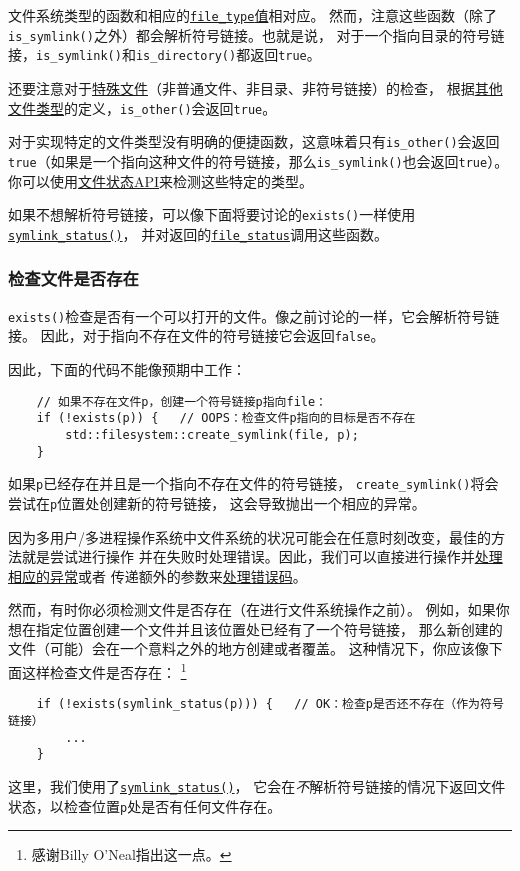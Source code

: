 文件系统类型的函数和相应的\hyperref[ch20.2.7]{\texttt{file\_type}值}相对应。
然而，注意这些函数（除了\texttt{is\_symlink()}之外）都会解析符号链接。也就是说，
对于一个指向目录的符号链接，\texttt{is\_symlink()}和\texttt{is\_directory()}都返回\texttt{true}。

还要注意对于\hyperref[文件类型]{特殊文件}（非普通文件、非目录、非符号链接）的检查，
根据\hyperref[文件类型]{其他文件类型}的定义，\texttt{is\_other()}会返回\texttt{true}。

对于实现特定的文件类型没有明确的便捷函数，这意味着只有\texttt{is\_other()}会返回
\texttt{true}（如果是一个指向这种文件的符号链接，那么\texttt{is\_symlink()}也会返回\texttt{true}）。
你可以使用\hyperref[ch20.4.2]{文件状态API}来检测这些特定的类型。

如果不想解析符号链接，可以像下面将要讨论的\texttt{exists()}一样使用\hyperref[t20.12]{\texttt{symlink\_status()}}，
并对返回的\hyperref[ch20.4.2]{\texttt{file\_status}}调用这些函数。

\subsubsection{检查文件是否存在}\label{ch20.4.1.1}
\texttt{exists()}检查是否有一个可以打开的文件。像之前讨论的一样，它会解析符号链接。
因此，对于指向不存在文件的符号链接它会返回\texttt{false}。

因此，下面的代码不能像预期中工作：
\begin{lstlisting}
    // 如果不存在文件p，创建一个符号链接p指向file：
    if (!exists(p)) {   // OOPS：检查文件p指向的目标是否不存在
        std::filesystem::create_symlink(file, p);
    }
\end{lstlisting}
如果\texttt{p}已经存在并且是一个指向不存在文件的符号链接，
\texttt{create\_symlink()}将会尝试在\texttt{p}位置处创建新的符号链接，
这会导致抛出一个相应的异常。

因为多用户/多进程操作系统中文件系统的状况可能会在任意时刻改变，最佳的方法就是尝试进行操作
并在失败时处理错误。因此，我们可以直接进行操作并\hyperref[ch20.2.6.1]{处理相应的异常}或者
传递额外的参数来\hyperref[ch20.2.6.2]{处理错误码}。

然而，有时你必须检测文件是否存在（在进行文件系统操作之前）。
例如，如果你想在指定位置创建一个文件并且该位置处已经有了一个符号链接，
那么新创建的文件（可能）会在一个意料之外的地方创建或者覆盖。
这种情况下，你应该像下面这样检查文件是否存在：
\footnote{感谢Billy O’Neal指出这一点。}
\begin{lstlisting}
    if (!exists(symlink_status(p))) {   // OK：检查p是否还不存在（作为符号链接）
        ...
    }
\end{lstlisting}
这里，我们使用了\hyperref[t20.12]{\texttt{symlink\_status()}}，
它会在\emph{不}解析符号链接的情况下返回文件状态，以检查位置\texttt{p}处是否有任何文件存在。

